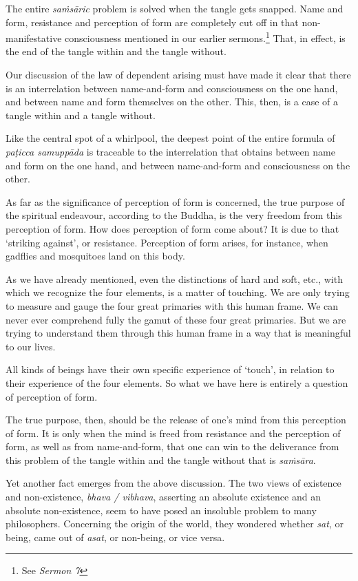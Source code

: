 The entire \emph{saṁsāric} problem is solved when the tangle gets snapped. Name and form, resistance and perception of form are completely cut off in that non-manifestative consciousness mentioned in our earlier sermons.\footnote{See \emph{Sermon 7}} That, in effect, is the end of the tangle within and the tangle without.

Our discussion of the law of dependent arising must have made it clear that there is an interrelation between name-and-form and consciousness on the one hand, and between name and form themselves on the other. This, then, is a case of a tangle within and a tangle without.

Like the central spot of a whirlpool, the deepest point of the entire formula of \emph{paṭicca samuppāda} is traceable to the interrelation that obtains between name and form on the one hand, and between name-and-form and consciousness on the other.

As far as the significance of perception of form is concerned, the true purpose of the spiritual endeavour, according to the Buddha, is the very freedom from this perception of form. How does perception of form come about? It is due to that `striking against', or resistance. Perception of form arises, for instance, when gadflies and mosquitoes land on this body.

As we have already mentioned, even the distinctions of hard and soft, etc., with which we recognize the four elements, is a matter of touching. We are only trying to measure and gauge the four great primaries with this human frame. We can never ever comprehend fully the gamut of these four great primaries. But we are trying to understand them through this human frame in a way that is meaningful to our lives.

All kinds of beings have their own specific experience of `touch', in relation to their experience of the four elements. So what we have here is entirely a question of perception of form.

The true purpose, then, should be the release of one's mind from this perception of form. It is only when the mind is freed from resistance and the perception of form, as well as from name-and-form, that one can win to the deliverance from this problem of the tangle within and the tangle without that is \emph{saṁsāra}.

Yet another fact emerges from the above discussion. The two views of existence and non-existence, \emph{bhava / vibhava}, asserting an absolute existence and an absolute non-existence, seem to have posed an insoluble problem to many philosophers. Concerning the origin of the world, they wondered whether \emph{sat}, or being, came out of \emph{asat}, or non-being, or vice versa.

